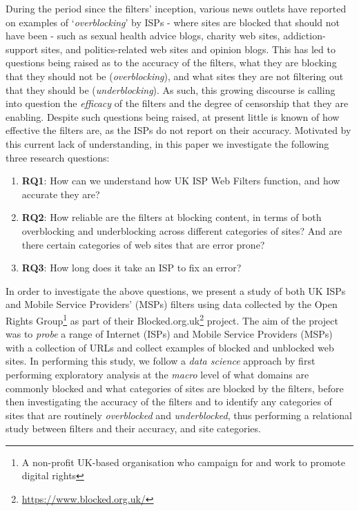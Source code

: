\documentclass{bmcart}
\begin{document}
During the period since the filters' inception, various news outlets have reported on examples of `\textit{overblocking}' by ISPs - where sites are blocked that should not have been - such as sexual health advice blogs, charity web sites, addiction-support sites, and politics-related web sites and opinion blogs.
This has led to questions being raised as to the accuracy of the filters, what they are blocking that they should not be (\textit{overblocking}), and what sites they are not filtering out that they should be (\textit{underblocking}).
As such, this growing discourse is  calling into question the \textit{efficacy} of the filters and the degree of censorship that they are enabling.
Despite such questions being raised, at present little is known of how effective the filters are, as the ISPs do not report on their accuracy.
Motivated by this current lack of understanding, in this paper we investigate the following three research questions:

\begin{enumerate}
	\item \textbf{RQ1}: How can we understand how UK ISP Web Filters function, and how accurate they are?
	\item \textbf{RQ2}: How reliable are the filters at blocking content, in terms of both overblocking and underblocking across different categories of sites? And are there certain categories of web sites that are error prone?
	\item \textbf{RQ3}: How long does it take an ISP to fix an error?
\end{enumerate}

In order to investigate the above questions, we present a study of both UK ISPs and Mobile Service Providers' (MSPs) filters using data collected by the Open Rights Group\footnote{A non-profit UK-based organisation who campaign for and work to promote digital rights} as part of their Blocked.org.uk\footnote{\url{https://www.blocked.org.uk/}} project.
The aim of the project was to \textit{probe} a range of Internet (ISPs) and Mobile Service Providers (MSPs) with a collection of URLs and collect examples of blocked and unblocked web sites.
In performing this study, we follow a \textit{data science} approach by first performing exploratory analysis at the \textit{macro} level of what domains are commonly blocked and what categories of sites are blocked by the filters, before then investigating the accuracy of the filters and to identify any categories of sites that are routinely \textit{overblocked} and \textit{underblocked}, thus performing a relational study between filters and their accuracy, and site categories.
\end{document}
